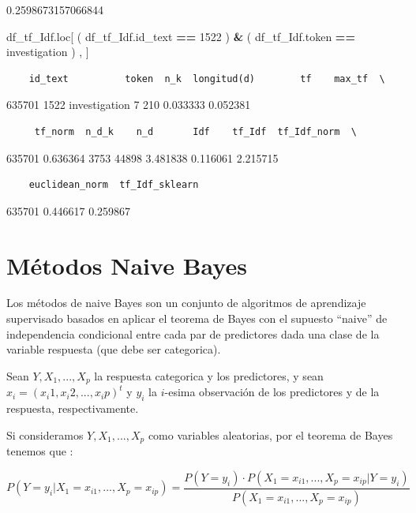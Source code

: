 \documentclass[
  11pt,
  a4paper,
]{article}
\newenvironment{Shaded}{\begin{snugshade}}{\end{snugshade}}
\newcommand{\DecValTok}[1]{\textcolor[rgb]{0.00,0.00,0.81}{#1}}
\newcommand{\NormalTok}[1]{#1}
\newcommand{\OperatorTok}[1]{\textcolor[rgb]{0.81,0.36,0.00}{\textbf{#1}}}
\newcommand{\StringTok}[1]{\textcolor[rgb]{0.31,0.60,0.02}{#1}}
\begin{document}
0.2598673157066844

\begin{Shaded}
\begin{Highlighting}[]
\NormalTok{df\_tf\_Idf.loc[ ( df\_tf\_Idf.id\_text }\OperatorTok{==} \DecValTok{1522}\NormalTok{ ) }\OperatorTok{\&}\NormalTok{  ( df\_tf\_Idf.token }\OperatorTok{==} \StringTok{\textquotesingle{}investigation\textquotesingle{}}\NormalTok{ ) , ]}
\end{Highlighting}
\end{Shaded}

\begin{verbatim}
    id_text          token  n_k  longitud(d)        tf    max_tf  \
\end{verbatim}

635701 1522 investigation 7 210 0.033333 0.052381

\begin{verbatim}
     tf_norm  n_d_k    n_d       Idf    tf_Idf  tf_Idf_norm  \
\end{verbatim}

635701 0.636364 3753 44898 3.481838 0.116061 2.215715

\begin{verbatim}
    euclidean_norm  tf_Idf_sklearn  
\end{verbatim}

635701 0.446617 0.259867

\newpage

\hypertarget{muxe9todos-naive-bayes}{%
\section{Métodos Naive Bayes}\label{muxe9todos-naive-bayes}}

Los métodos de naive Bayes son un conjunto de algoritmos de aprendizaje
supervisado basados en aplicar el teorema de Bayes con el supuesto
``naive'' de independencia condicional entre cada par de predictores
dada una clase de la variable respuesta (que debe ser categorica).

Sean \(Y,X_1,...,X_p\) la respuesta categorica y los predictores, y sean
\(x_i = (x_i1 , x_i2, ..., x_ip)^t\) y \(y_i\) la \(i\)-esima
observación de los predictores y de la respuesta, respectivamente.

Si consideramos \(Y,X_1,...,X_p\) como variables aleatorias, por el
teorema de Bayes tenemos que :

\[P(Y=y_i | X_1 = x_{i1} ,..., X_p=x_{ip}) = \dfrac{P(Y=y_i)\cdot P(X_1=x_{i1} ,..., X_p=x_{ip} | Y=y_i)}{P(X_1=x_{i1} ,..., X_p=x_{ip})}\]
\end{document}
